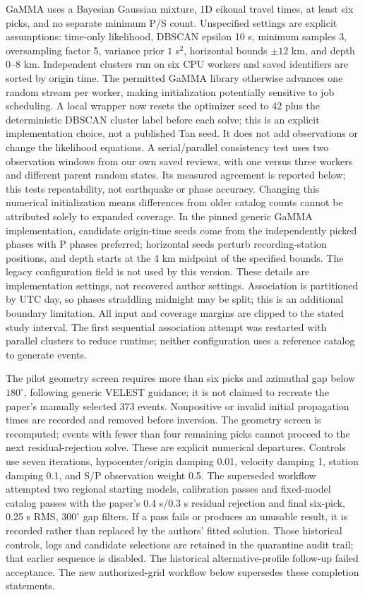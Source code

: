 GaMMA uses a Bayesian Gaussian mixture, 1D eikonal travel times, at least six picks, and no separate minimum P/S count. Unspecified settings are explicit assumptions: time-only likelihood, DBSCAN epsilon 10 s, minimum samples 3, oversampling factor 5, variance prior $1$ s$^2$, horizontal bounds $\pm12$ km, and depth 0--8 km. Independent clusters run on six CPU workers and saved identifiers are sorted by origin time. The permitted GaMMA library otherwise advances one random stream per worker, making initialization potentially sensitive to job scheduling. A local wrapper now resets the optimizer seed to 42 plus the deterministic DBSCAN cluster label before each solve; this is an explicit implementation choice, not a published Tan seed. It does not add observations or change the likelihood equations. A serial/parallel consistency test uses two observation windows from our own saved reviews, with one versus three workers and different parent random states. Its measured agreement is reported below; this tests repeatability, not earthquake or phase accuracy. Changing this numerical initialization means differences from older catalog counts cannot be attributed solely to expanded coverage. In the pinned generic GaMMA implementation, candidate origin-time seeds come from the independently picked phases with P phases preferred; horizontal seeds perturb recording-station positions, and depth starts at the 4 km midpoint of the specified bounds. The legacy  configuration field is not used by this version. These details are implementation settings, not recovered author settings. Association is partitioned by UTC day, so phases straddling midnight may be split; this is an additional boundary limitation. All input and coverage margins are clipped to the stated study interval. The first sequential association attempt was restarted with parallel clusters to reduce runtime; neither configuration uses a reference catalog to generate events.


The pilot geometry screen requires more than six picks and azimuthal gap below $180^\circ$, following generic VELEST guidance; it is not claimed to recreate the paper's manually selected 373 events. Nonpositive or invalid initial propagation times are recorded and removed before inversion. The geometry screen is recomputed; events with fewer than four remaining picks cannot proceed to the next residual-rejection solve. These are explicit numerical departures. Controls use seven iterations, hypocenter/origin damping 0.01, velocity damping 1, station damping 0.1, and S/P observation weight 0.5. The superseded workflow attempted two regional starting models, calibration passes and fixed-model catalog passes with the paper's 0.4 s/0.3 s residual rejection and final six-pick, 0.25 s RMS, $300^\circ$ gap filters. If a pass fails or produces an unusable result, it is recorded rather than replaced by the authors' fitted solution. Those historical controls, logs and candidate selections are retained in the quarantine audit trail; that earlier sequence is disabled. The historical alternative-profile follow-up failed acceptance. The new authorized-grid workflow below supersedes these completion statements.

